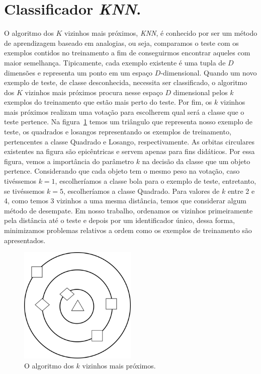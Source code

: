\section{Classificador \textit{KNN}.}
\label{subsec::cred_knn}


O algoritmo dos $K$ vizinhos mais próximos, \textit{KNN}, é conhecido por ser um método de aprendizagem baseado em analogias, ou seja, comparamos o teste com os exemplos contidos no treinamento a fim de conseguirmos encontrar aqueles com maior semelhança. 
Tipicamente, cada exemplo existente é uma tupla de $D$ dimensões e representa um ponto em um espaço $D$-dimensional. 
Quando um novo exemplo de teste, de classe desconhecida, necessita ser classificado, o algoritmo dos $K$ vizinhos mais próximos procura nesse espaço $D$ dimensional pelos $k$ exemplos do treinamento que estão mais perto do teste. 
Por fim, os $k$ vizinhos mais próximos realizam uma votação para escolherem qual será a classe que o teste pertence.
Na figura~\ref{fig::knn} temos um triângulo que representa nosso exemplo de teste, os quadrados e losangos representando os exemplos de treinamento, pertencentes a classe Quadrado e Losango, respectivamente. As orbitas circulares existentes na figura são epicêntricas e servem apenas para fins didáticos.
Por essa figura, vemos a importância do parâmetro $k$ na decisão da classe que um objeto pertence. Considerando que cada objeto tem o mesmo peso na votação, caso tivéssemos $k=1$, escolheríamos a classe bola para o exemplo de teste, entretanto, se tivéssemos $k=5$, escolheríamos a classe Quadrado. Para valores de $k$ entre 2 e 4, como temos 3 vizinhos a uma mesma distância, temos que considerar algum método de desempate. Em nosso trabalho, ordenamos os vizinhos primeiramente pela distância até o teste e depois por um identificador único, dessa forma, minimizamos problemas relativos a ordem como os exemplos de treinamento são apresentados.

\begin{figure}[ht!]
\centering
\includegraphics[width=0.5\textwidth]{figures/knn.png}
\caption{O algoritmo dos $k$ vizinhos mais próximos.}
\label{fig::knn}
\end{figure}


